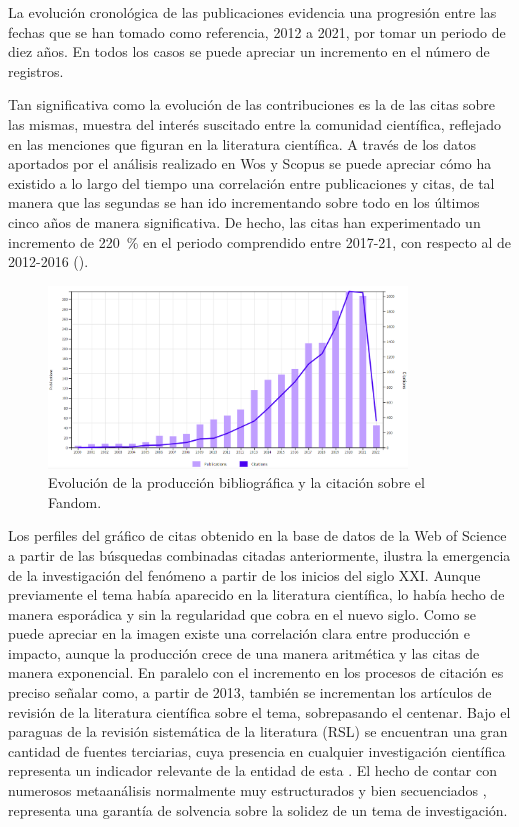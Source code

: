 \documentclass[spanish]{textolivre}
\begin{document}
La evolución cronológica de las publicaciones evidencia una progresión entre las fechas que se han tomado como referencia, 2012 a 2021, por tomar un periodo de diez años. En todos los casos se puede apreciar un incremento en el número de registros.

Tan significativa como la evolución de las contribuciones es la de las citas sobre las mismas, muestra del interés suscitado entre la comunidad científica, reflejado en las menciones que figuran en la literatura científica. A través de los datos aportados por el análisis realizado en Wos y Scopus se puede apreciar cómo ha existido a lo largo del tiempo una correlación entre publicaciones y citas, de tal manera que las segundas se han ido incrementando sobre todo en los últimos cinco años de manera significativa. De hecho, las citas han experimentado un incremento de 220~\% en el periodo comprendido entre 2017-21, con respecto al de 2012-2016 (). 

\begin{figure}[htbp]
 \centering
 \includegraphics[width=0.85\textwidth]{Fig1.png}
 \caption{Evolución de la producción bibliográfica y la citación sobre el Fandom.}
 \label{fig01}
\end{figure}

Los perfiles del gráfico de citas obtenido en la base de datos de la Web of Science a partir de las búsquedas combinadas citadas anteriormente, ilustra la emergencia de la investigación del fenómeno a partir de los inicios del siglo XXI. Aunque previamente el tema había aparecido en la literatura científica, lo había hecho de manera esporádica y sin la regularidad que cobra en el nuevo siglo. Como se puede apreciar en la imagen existe una correlación clara entre producción e impacto, aunque la producción crece de una manera aritmética y las citas de manera exponencial. En paralelo con el incremento en los procesos de citación es preciso señalar como, a partir de 2013, también se incrementan los artículos de revisión de la literatura científica sobre el tema, sobrepasando el centenar. Bajo el paraguas de la revisión sistemática de la literatura (RSL) se encuentran una gran cantidad de fuentes terciarias, cuya presencia en cualquier investigación científica representa un indicador relevante de la entidad de esta \cite{cordon_garcia_nuevas_2016,gomez_diaz_fuentes_2017}. El hecho de contar con numerosos metaanálisis normalmente muy estructurados y bien secuenciados \cite{tricco_prisma_2018}, representa una garantía de solvencia sobre la solidez de un tema de investigación.
\end{document}
